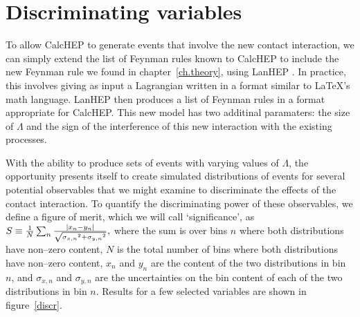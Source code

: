 \section{Discriminating variables}
To allow CalcHEP to generate events that involve the new contact interaction, we can simply extend the list of Feynman rules known to CalcHEP to include the new Feynman rule we found in chapter~\ref{ch.theory}, using LanHEP \cite{lanhep}. In practice, this involves giving as input a Lagrangian written in a format similar to \LaTeX's math language. LanHEP then produces a list of Feynman rules in a format appropriate for CalcHEP. This new model has two additinal paramaters: the size of $\Lambda$ and the sign of the interference of this new interaction with the existing processes.

With the ability to produce sets of events with varying values of $\Lambda$, the opportunity presents itself to create simulated distributions of events for several potential observables that we might examine to discriminate the effects of the contact interaction. To quantify the discriminating power of these observables, we define a figure of merit, which we will call `significance', as
\(S\equiv\frac{1}{N}\sum_n \frac{|x_n-y_n|}{\sqrt{{\sigma_{x,n}}^2+{\sigma_{y,n}}^2}},\label{significance}\)
where the sum is over bins $n$ where both distributions have non--zero content, $N$ is the total number of bins where both distributions have non--zero content, $x_n$ and $y_n$ are the content of the two distributions in bin $n$, and $\sigma_{x,n}$ and $\sigma_{y,n}$ are the uncertainties on the bin content of each of the two distributions in bin $n$.
Results for a few selected variables are shown in figure~\ref{discr}.

